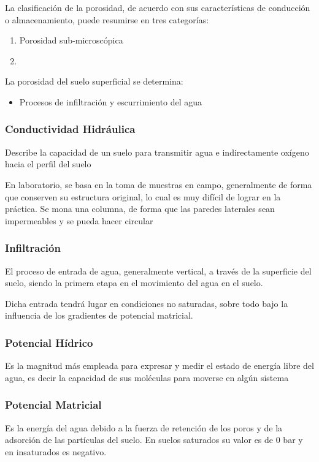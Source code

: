 La clasificación de la porosidad, de acuerdo con sus características de conducción o almacenamiento, puede resumirse en tres categorías:
\begin{enumerate}
    \item Porosidad sub-microscópica
    \item 
\end{enumerate}
La porosidad del suelo superficial se determina:
\begin{itemize}
    \item Procesos de infiltración y escurrimiento del agua
\end{itemize}

\subsubsection{Conductividad Hidráulica}
Describe la capacidad de un suelo para transmitir agua e indirectamente oxígeno hacia el perfil del suelo

En laboratorio, se basa en la toma de muestras en campo, generalmente de forma que conserven su estructura original, lo cual es muy difícil de lograr en la práctica. Se mona  una columna, de forma que las paredes laterales sean impermeables y se pueda hacer circular

\subsubsection{Infiltración}
El proceso de entrada de agua, generalmente vertical, a través de la superficie del suelo, siendo la primera etapa en el movimiento del agua en el suelo.

Dicha entrada tendrá lugar en condiciones no saturadas, sobre todo bajo la influencia de los gradientes de potencial matricial.

\subsubsection{Potencial Hídrico}
Es la magnitud más empleada para expresar y medir el estado de energía libre del agua, es decir la capacidad de sus moléculas para moverse en algún sistema

\subsubsection{Potencial Matricial}
Es la energía del agua debido a la fuerza de retención de los poros y de la adsorción de las partículas del suelo. En suelos saturados su valor es de 0 bar y en insaturados es negativo.

